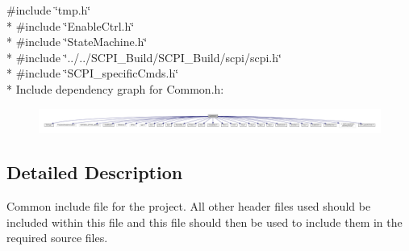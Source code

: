 {\ttfamily \#include \char`\"{}tmp.\-h\char`\"{}}\\*
{\ttfamily \#include \char`\"{}Enable\-Ctrl.\-h\char`\"{}}\\*
{\ttfamily \#include \char`\"{}State\-Machine.\-h\char`\"{}}\\*
{\ttfamily \#include \char`\"{}../../\-S\-C\-P\-I\-\_\-\-Build/\-S\-C\-P\-I\-\_\-\-Build/scpi/scpi.\-h\char`\"{}}\\*
{\ttfamily \#include \char`\"{}S\-C\-P\-I\-\_\-specific\-Cmds.\-h\char`\"{}}\\*
Include dependency graph for Common.\-h\-:
\nopagebreak
\begin{figure}[H]
\begin{center}
\leavevmode
\includegraphics[width=350pt]{a00062}
\end{center}
\end{figure}


\subsection{Detailed Description}
Common include file for the project. All other header files used should be included within this file and this file should then be used to include them in the required source files. 